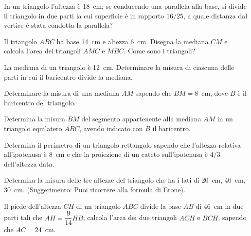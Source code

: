 \begin{multicols}{2}
\begin{esercizio}
\label{ese:7.72}
In un triangolo l'altezza è 18~cm; se conducendo una parallela alla 
base, si divide il triangolo in due parti la cui superficie è in 
rapporto \(16/25\), a quale distanza dal vertice è stata condotta la 
parallela?
\end{esercizio}

\begin{esercizio}
\label{ese:7.73}
Il triangolo \(ABC\) ha base 14~cm e altezza 6~cm. Disegna la mediana 
\(CM\) e calcola l'area dei triangoli \(AMC\) e \(MBC\). Come sono i 
triangoli?
\end{esercizio}

\begin{esercizio}
\label{ese:7.74}
La mediana di un triangolo è 12~cm. Determinare la misura di ciascuna 
delle parti in cui il baricentro divide la mediana.
\end{esercizio}

\begin{esercizio}
\label{ese:7.75}
Determinare la misura di una mediana \(AM\) sapendo che \(BM=8\)~cm, dove 
\(B\) è il baricentro del triangolo.
\end{esercizio}

\begin{esercizio}
\label{ese:7.76}
Determina la misura \(BM\) del segmento appartenente alla mediana \(AM\) 
in un triangolo equilatero \(ABC\), avendo indicato con \(B\) il 
baricentro. 
\end{esercizio}

\begin{esercizio}
\label{ese:7.77}
Determina il perimetro di un triangolo rettangolo sapendo che 
l'altezza relativa all'ipotenusa è 8~cm e che la proiezione di un 
cateto sull'ipotenusa è \(4/3\) dell'altezza data.
\end{esercizio}

\begin{esercizio}
\label{ese:7.78}
Determina la misura delle tre altezze del triangolo che ha i lati di 
20~cm, 40~cm, 30~cm. (Suggerimento: Puoi ricorrere alla formula di 
Erone).
\end{esercizio}

\begin{esercizio}
\label{ese:7.79}
Il piede dell'altezza \(CH\) di un triangolo \(ABC\) divide la base \(AB\) 
di 46~cm in due parti tali che \(AH=\dfrac{9}{14}HB\); calcola l'area 
dei due triangoli \(ACH\) e \(BCH\), sapendo che \(AC=24\)~cm.
\end{esercizio}


\end{multicols}
